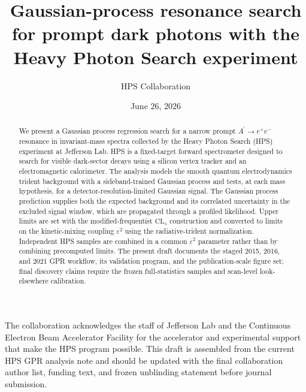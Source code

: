 \documentclass[aps,prd,reprint,superscriptaddress,nofootinbib]{revtex4-2}
\newcommand{\Ap}{A^{\prime}}
\newcommand{\eps}{\varepsilon}
\newcommand{\CLs}{\mathrm{CL}_{s}}
\begin{document}
\title{Gaussian-process resonance search for prompt dark photons with the Heavy Photon Search experiment}

\author{HPS Collaboration}

\date{June 26, 2026}

\begin{abstract}
We present a Gaussian process regression search for a narrow prompt
$\Ap \to e^+e^-$ resonance in invariant-mass spectra collected by the Heavy Photon
Search (HPS) experiment at Jefferson Lab. HPS is a fixed-target forward
spectrometer designed to search for visible dark-sector decays using a silicon vertex
tracker and an electromagnetic calorimeter. The analysis models the smooth quantum
electrodynamics trident background with a sideband-trained Gaussian process and tests,
at each mass hypothesis, for a detector-resolution-limited Gaussian signal. The
Gaussian process prediction supplies both the expected background and its correlated
uncertainty in the excluded signal window, which are propagated through a profiled
likelihood. Upper limits are set with the modified-frequentist $\CLs$ construction and
converted to limits on the kinetic-mixing coupling $\eps^2$ using the
radiative-trident normalization. Independent HPS samples are combined in a common
$\eps^2$ parameter rather than by combining precomputed limits. The present draft
documents the staged 2015, 2016, and 2021 GPR workflow, its validation program, and
the publication-scale figure set; final discovery claims require the frozen
full-statistics samples and scan-level look-elsewhere calibration.
\end{abstract}

\maketitle









\appendix

\clearpage

\begin{acknowledgments}
The collaboration acknowledges the staff of Jefferson Lab and the Continuous Electron
Beam Accelerator Facility for the accelerator and experimental support that make the
HPS program possible. This draft is assembled from the current HPS GPR analysis note
and should be updated with the final collaboration author list, funding text, and
frozen unblinding statement before journal submission.
\end{acknowledgments}



\end{document}
